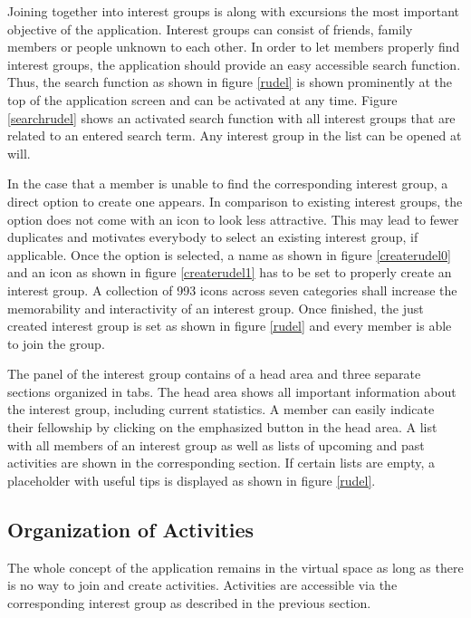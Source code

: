 \documentclass[12pt,numbers=noenddot,parskip,bibliography=totocnumbered,listof=totocnumbered]{scrreprt}
\begin{document}
Joining together into interest groups is along with excursions the most important objective of the application. Interest groups can consist of friends, family members or people unknown to each other. In order to let members properly find interest groups, the application should provide an easy accessible search function. Thus, the search function as shown in figure \ref{rudel} is shown prominently at the top of the application screen and can be activated at any time. Figure \ref{searchrudel} shows an activated search function with all interest groups that are related to an entered search term. Any interest group in the list can be opened at will. 

In the case that a member is unable to find the corresponding interest group, a direct option to create one appears. In comparison to existing interest groups, the option does not come with an icon to look less attractive. This may lead to fewer duplicates and motivates everybody to select an existing interest group, if applicable. Once the option is selected, a name as shown in figure \ref{createrudel0} and an icon as shown in figure \ref{createrudel1} has to be set to properly create an interest group. A collection of 993 icons across seven categories shall increase the memorability and interactivity of an interest group. Once finished, the just created interest group is set as shown in figure \ref{rudel} and every member is able to join the group.

The panel of the interest group contains of a head area and three separate sections organized in tabs. The head area shows all important information about the interest group, including current statistics. A member can easily indicate their fellowship by clicking on the emphasized button in the head area. A list with all members of an interest group as well as lists of upcoming and past activities are shown in the corresponding section. If certain lists are empty, a placeholder with useful tips is displayed as shown in figure \ref{rudel}. 

\subsection{Organization of Activities}
The whole concept of the application remains in the virtual space as long as there is no way to join and create activities. Activities are accessible via the corresponding interest group as described in the previous section. 
\end{document}
